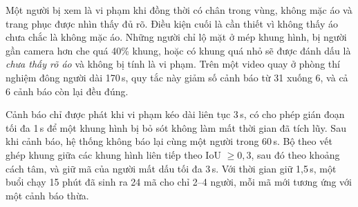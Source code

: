 \documentclass[11pt,a4paper,twocolumn]{article}
\begin{document}
Một người bị xem là vi phạm khi đồng thời có chân trong vùng, không mặc áo và trang phục được nhìn thấy đủ rõ. Điều kiện cuối là cần thiết vì không thấy áo chưa chắc là
không mặc áo. Những người chỉ lộ mặt ở mép khung hình, bị người gần camera hơn che quá 40\% khung, hoặc có khung quá nhỏ sẽ được đánh dấu là \emph{chưa thấy rõ áo} và không bị
tính là vi phạm. Trên một video quay ở phòng thí nghiệm đông người dài 170\,s, quy tắc này giảm số cảnh báo từ 31 xuống 6, và cả 6 cảnh báo còn lại đều đúng.

Cảnh báo chỉ được phát khi vi phạm kéo dài liên tục 3\,s, có cho phép gián đoạn tối đa 1\,s để một khung hình bị bỏ sót không làm mất thời gian đã tích lũy. Sau khi cảnh báo,
hệ thống không báo lại cùng một người trong 60\,s. Bộ theo vết ghép khung giữa các khung hình liên tiếp theo IoU $\ge0{,}3$, sau đó theo khoảng cách tâm, và giữ mã của người mất dấu
tối đa 3\,s. Với thời gian giữ 1,5\,s, một buổi chạy 15 phút đã sinh ra 24 mã cho chỉ 2--4 người, mỗi mã mới tương ứng với một cảnh báo thừa.

\begin{figure}[t]
\centering
{}
\label{alg:loop}
\end{figure}
\end{document}
